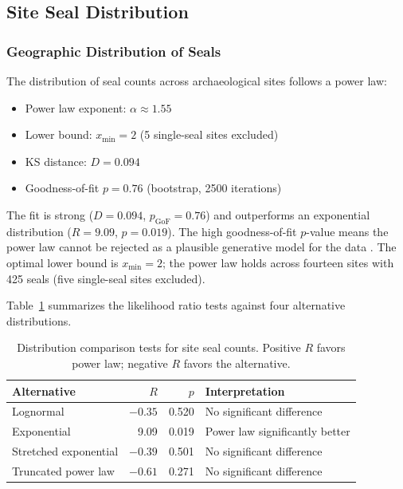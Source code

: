 \documentclass[12pt]{article}
\begin{document}
\subsection{Site Seal Distribution}

\subsubsection{Geographic Distribution of Seals}

The distribution of seal counts across archaeological sites follows a power law:

\begin{itemize}
    \item Power law exponent: $\alpha \approx 1.55$
    \item Lower bound: $x_{\min} = 2$ (5 single-seal sites excluded)
    \item KS distance: $D = 0.094$
    \item Goodness-of-fit $p = 0.76$ (bootstrap, 2500 iterations)
\end{itemize}

The fit is strong ($D = 0.094$, $p_{\text{GoF}} = 0.76$) and outperforms
an exponential distribution ($R = 9.09$, $p = 0.019$). The high goodness-of-fit $p$-value
means the power law cannot be rejected as a plausible generative model for the data
\citep{clauset2009power}. The optimal lower bound is $x_{\min} = 2$; the power law holds across
fourteen sites with 425 seals (five single-seal sites excluded).

Table~\ref{tab:site_compare} summarizes the likelihood ratio tests against four alternative
distributions.

\begin{table}[h]
\centering
\caption{Distribution comparison tests for site seal counts.
Positive $R$ favors power law; negative $R$ favors the alternative.}
\label{tab:site_compare}
\begin{tabular}{@{}lrrl@{}}
\toprule
Alternative & $R$ & $p$ & Interpretation \\
\midrule
Lognormal & $-0.35$ & 0.520 & No significant difference \\
Exponential & 9.09 & 0.019 & Power law significantly better \\
Stretched exponential & $-0.39$ & 0.501 & No significant difference \\
Truncated power law & $-0.61$ & 0.271 & No significant difference \\
\bottomrule
\end{tabular}
\end{table}
\end{document}
